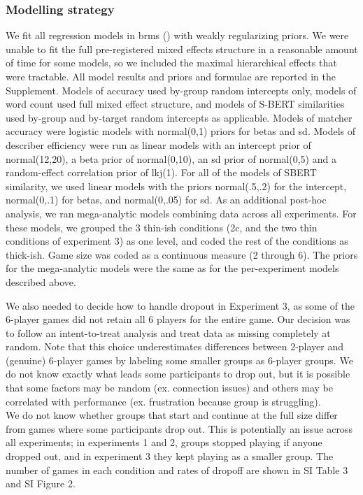 \documentclass[
  english,
]{article}
\begin{document}
\subsubsection{Modelling strategy}\label{modelling-strategy}

We fit all regression models in brms () with weakly regularizing priors.
We were unable to fit the full pre-registered mixed effects structure in a reasonable amount of time for some models, so we included the maximal hierarchical effects that were tractable.
All model results and priors and formulae are reported in the Supplement.
Models of accuracy used by-group random intercepts only, models of word count used full mixed effect structure, and models of S-BERT similarities used by-group and by-target random intercepts as applicable.
Models of matcher accuracy were logistic models with normal(0,1) priors for betas and sd.
Models of describer efficiency were run as linear models with an intercept prior of normal(12,20), a beta prior of normal(0,10), an sd prior of normal(0,5) and a random-effect correlation prior of lkj(1).
For all of the models of SBERT similarity, we used linear models with the priors normal(.5,.2) for the intercept, normal(0,.1) for betas, and normal(0,.05) for sd.
As an additional post-hoc analysis, we ran mega-analytic models combining data across all experiments.
For these models, we grouped the 3 thin-ish conditions (2c, and the two thin conditions of experiment 3) as one level, and coded the rest of the conditions as thick-ish.
Game size was coded as a continuous measure (2 through 6). The priors for the mega-analytic models were the same as for the per-experiment models described above.

We also needed to decide how to handle dropout in Experiment 3, as some of the 6-player games did not retain all 6 players for the entire game.
Our decision was to follow an intent-to-treat analysis and treat data as missing completely at random.
Note that this choice underestimates differences between 2-player and (genuine) 6-player games by labeling some smaller groups as 6-player groups.
We do not know exactly what leads some participants to drop out, but it is possible that some factors may be random (ex. connection issues) and others may be correlated with performance (ex. frustration because group is struggling).\\
We do not know whether groups that start and continue at the full size differ from games where some participants drop out.
This is potentially an issue across all experiments; in experiments 1 and 2, groups stopped playing if anyone dropped out, and in experiment 3 they kept playing as a smaller group.
The number of games in each condition and rates of dropoff are shown in SI Table 3 and SI Figure 2.
\end{document}
